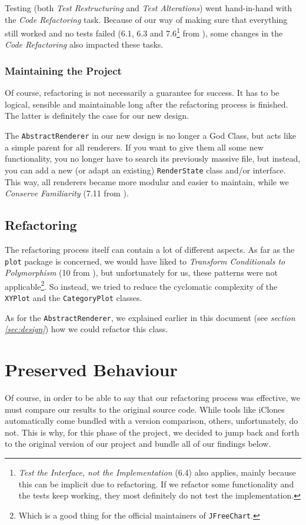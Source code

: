\documentclass[11pt]{article}
\begin{document}
	Testing (both \textsl{Test Restructuring} and \textsl{Test Alterations}) went hand-in-hand with the \textsl{Code Refactoring} task. Because of our way of making sure that everything still worked and no tests failed (6.1, 6.3 and 7.6\footnote{\textsl{Test the Interface, not the Implementation} (6.4) also applies, mainly because this can be implicit due to refactoring. If we refactor some functionality and the tests keep working, they most definitely do not test the implementation.} from \cite{demeyer2009object}), some changes in the \textsl{Code Refactoring} also impacted these tasks.
	
	\subsubsection{Maintaining the Project}
	Of course, refactoring is not necessarily a guarantee for success. It has to be logical, sensible and maintainable long after the refactoring process is finished. The latter is definitely the case for our new design.
	
	The \texttt{AbstractRenderer} in our new design is no longer a God Class, but acts like a simple parent for all renderers. If you want to give them all some new functionality, you no longer have to search its previously massive file, but instead, you can add a new (or adapt an existing) \texttt{RenderState} class and/or interface. This way, all renderers became more modular and easier to maintain, while we \textsl{Conserve Familiarity} (7.11 from \cite{demeyer2009object}).
	
	\subsection{Refactoring}
	\label{sec:refactoring}
	The refactoring process itself can contain a lot of different aspects. As far as the \texttt{plot} package is concerned, we would have liked to \textsl{Transform Conditionals to Polymorphism} (10 from \cite{demeyer2009object}), but unfortunately for us, these patterns were not applicable\footnote{Which is a good thing for the official maintainers of \texttt{JFreeChart}.}. So instead, we tried to reduce the cyclomatic complexity of the \texttt{XYPlot} and the \texttt{CategoryPlot} classes.
	
	As for the \texttt{AbstractRenderer}, we explained earlier in this document (see \textsl{section \ref{sec:design}}) how we could refactor this class.
	
	\section{Preserved Behaviour}
	\label{sec:pb}
	Of course, in order to be able to say that our refactoring process was effective, we must compare our results to the original source code. While tools like \textsf{iClones} \cite{iclones} automatically come bundled with a version comparison, others, unfortunately, do not. This is why, for this phase of the project, we decided to jump back and forth to the original version of our project and bundle all of our findings below.
	
\end{document}

